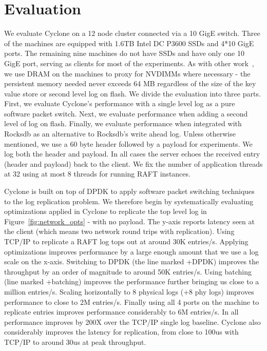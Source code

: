 \documentclass[10pt, preprint, nonatbib]{sigplanconf}
\begin{document}
\section{Evaluation}
We evaluate Cyclone on a 12 node cluster connected via a 10 GigE switch. Three
of the machines are equipped with 1.6TB Intel DC P3600 SSDs and 4*10 GigE
ports. The remaining nine machines do not have SSDs and have only one 10 GigE
port, serving as clients for most of the experiments. As with other
work~\cite{faast}, we use DRAM on the machines to proxy for NVDIMMs where
necessary - the persistent memory needed never exceeds 64 MB regardless of the
size of the key value store or second level log on flash. We divide the
evaluation into three parts. First, we evaluate Cyclone's performance with a
single level log as a pure software packet switch. Next, we evaluate performance
when adding a second level of log on flash. Finally, we evaluate performance
when integrated with Rocksdb as an alternative to Rocksdb's write ahead
log. Unless otherwise mentioned, we use a 60 byte header followed by a payload
for experiments. We log both the header and payload. In all cases the server
echoes the received entry (header and payload) back to the client. We fix the
number of application threads at 32 using at most 8 threads for running RAFT
instances.

Cyclone is built on top of DPDK to apply software packet switching techniques to
the log replication problem. We therefore begin by systematically evaluating
optimizations applied in Cyclone to replicate the top level log in
Figure~\ref{fig:network_opts} - with no payload. The y-axis reports latency seen
at the client (which means two network round trips with replication). Using
TCP/IP to replicate a RAFT log tops out at around 30K entries/s. Applying
optimizations improves performance by a large enough amount that we use a log
scale on the x-axis. Switching to DPDK (the line marked +DPDK) improves the
throughput by an order of magnitude to around 50K entries/s. Using batching
(line marked +batching) improves the performance further bringing us close to a
million entries/s. Scaling horizontally to 8 physical logs (+8 phy logs)
improves performance to close to 2M entries/s. Finally using all 4 ports on the
machine to replicate entries improves performance considerably to 6M
entries/s. In all performance improves by 200X over the TCP/IP single log
baseline. Cyclone also considerably improves the latency for replication, from
close to 100us with TCP/IP to around 30us at peak throughput.
\end{document}
